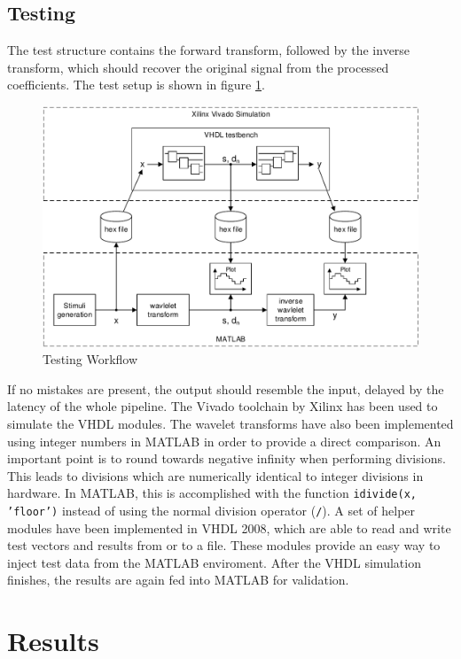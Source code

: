 \begin{refsection}
\subsection{Testing}

The test structure contains the forward transform, followed by the inverse transform, which should recover the original signal from the processed coefficients.
The test setup is shown in figure \ref{fpga:fig:testing}.
\begin{figure}
	\centering
	\includegraphics[width=\textwidth]{papers/fpga/images/vhdl_sim.pdf}
	\caption{Testing Workflow \label{fpga:fig:testing}}
\end{figure}
If no mistakes are present, the output should resemble the input, delayed by the latency of the whole pipeline.
The Vivado toolchain by Xilinx has been used to simulate the VHDL modules.
%
%
The wavelet transforms have also been implemented using integer numbers in MATLAB in order to provide a direct comparison.
An important point is to round towards negative infinity when performing divisions.
This leads to divisions which are numerically identical to integer divisions in hardware.
In MATLAB, this is accomplished with the function \texttt{idivide(x, 'floor')} instead of using the normal division operator (\texttt{/}).
A set of helper modules have been implemented in VHDL 2008, which are able to read and write test vectors and results from or to a file.
These modules provide an easy way to inject test data from the MATLAB enviroment.
After the VHDL simulation finishes, the results are again fed into MATLAB for validation.

\section{Results}


\end{refsection}
